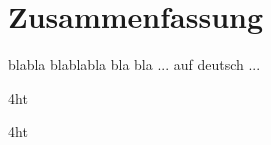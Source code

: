 \documentclass[
  a4paper,  %
  twoside,  %
  bibliography=totoc,
  headsepline,
  cleardoublepage=empty,
  parskip=half,
  draft=false
]{scrbook}
\begin{document}

\pagebreak
\section*{Zusammenfassung}

blabla blablabla bla bla ... auf deutsch ...
\cleardoublepage



\iftex4ht
\else
\fi

%
%

%
%
%

\setcounter{tocdepth}{2}
\tableofcontents


{\listoffigures\let\clearpage\relax\listoftables\let\clearpage\relax{}\let\clearpage\relax\printnoidxglossaries}





\iftex4ht
\else
\fi
\end{document}
